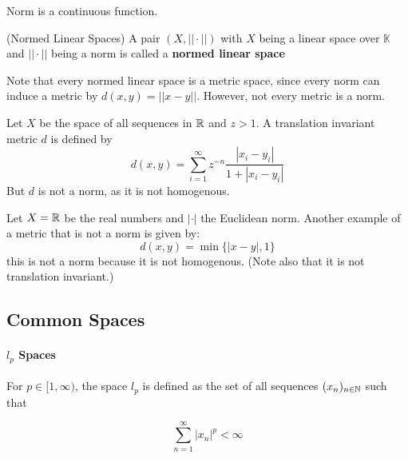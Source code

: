 \documentclass{article}
\begin{document}
\begin{remark}
    Norm is a continuous function.
\end{remark}

\begin{defn}
(Normed Linear Spaces) A pair $(X, ||\cdot||)$ with $X$ being a linear space over $\mathbb{K}$ and 
                    $||\cdot||$ being a norm is called a \textbf{normed linear space}
\end{defn} 

Note that every normed linear space is a metric space, since every norm can induce a metric by $d(x,y)=||x-y||$. 
However, not every metric is a norm.  

\begin{eg}
    Let $X$ be the space of all sequences in $\mathbb{R}$ and $z>1$. A translation invariant metric $d$ is defined by  
    \begin{equation*}
        d(x,y) = \sum_{i=1}^{\infty} z^{-n} \dfrac{|x_i-y_i|}{1+|x_i-y_i|}
    \end{equation*}  
    But $d$ is not a norm, as it is not homogenous.
\end{eg}  

\begin{eg}
    Let $X=\mathbb{R}$ be the real numbers and $|\cdot|$ the Euclidean norm. Another example of a metric that is not a norm 
    is given by:
    \begin{equation*}
        d(x,y) = \min \{|x-y|, 1\}
    \end{equation*}  
    this is not a norm because it is not homogenous. (Note also that it is not translation invariant.)
\end{eg}  
\subsection{Common Spaces}  

\paragraph*{$l_p$ Spaces}    
For $p \in [1,\infty)$, the space $l_p$ is defined as the set of all sequences $(x_n)_{n\in \mathbb{N}}$ such that  

\begin{equation*}
    \sum_{n=1}^{\infty} |x_n|^p < \infty
\end{equation*}
\end{document}
